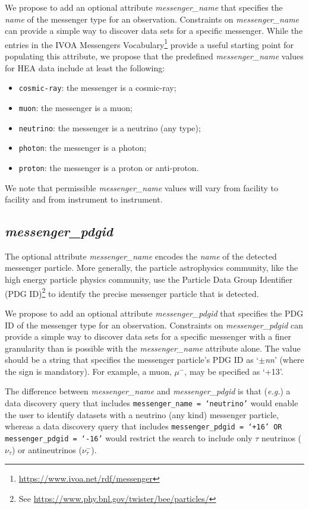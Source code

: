 \documentclass[11pt,a4paper]{ivoa}
\begin{document}
We propose to add an optional attribute {\em messenger\_name\/} that specifies the {\em name} of the messenger type for an observation.  Constraints on {\em messenger\_name\/} can provide a simple way to discover data sets for a specific messenger.  While the entries in the IVOA Messengers Vocabulary\footnote{\url{https://www.ivoa.net/rdf/messenger}} provide a useful starting point for populating this attribute, we propose that the predefined {\em messenger\_name\/} values for \gls{HEA} data include at least the following:
\begin{itemize}
	\item \texttt{cosmic-ray}: the messenger is a cosmic-ray;
	\item \texttt{muon}: the messenger is a muon;
	\item \texttt{neutrino}: the messenger is a neutrino (any type);
	\item \texttt{photon}: the messenger is a photon;
	\item \texttt{proton}: the messenger is a proton or anti-proton.
\end{itemize}
We note that permissible {\em messenger\_name\/} values will vary from facility to facility and from instrument to instrument.

\subsection{{\em messenger\_pdgid}}
\label{sec:messenger_pdgid}

The optional attribute {\em messenger\_name\/} encodes the {\em name\/} of the detected messenger particle.  More generally, the particle astrophysics community, like the high energy particle physics community,  use the Particle Data Group Identifier (PDG ID)\footnote{See \url{https://www.phy.bnl.gov/twister/bee/particles/}} to identify the precise messenger particle that is detected.  

We propose to add an optional attribute {\em messenger\_pdgid\/} that specifies the PDG ID of the messenger type for an observation.  Constraints on {\em messenger\_pdgid\/} can provide a simple way to discover data sets for a specific messenger with a finer granularity than is possible with the {\em messenger\_name\/} attribute alone.  The value should be a string that specifies the messenger particle's PDG ID as `{\em $\pm$nn\/}' (where the sign is mandatory).  For example, a muon, $\mu^{-}$, may be specified as `+13'. 

The difference between {\em messenger\_name\/} and {\em messenger\_pdgid} is that ({\em e.g.\/}) a data discovery query that includes {\tt messenger\_name = `neutrino'} would enable the user to identify datasets with a neutrino (any kind) messenger particle, whereas a data discovery query that includes {\tt messenger\_pdgid = `+16' OR messenger\_pdgid = `-16'} would restrict the search to include only $\tau$ neutrinos ($\nu_\tau$) or antineutrinos ($\nu_\tau^{-}$).
\end{document}
